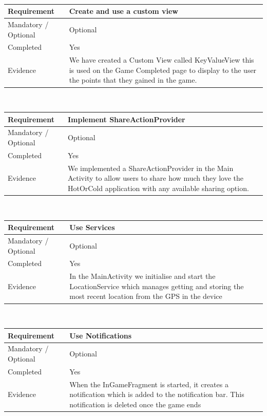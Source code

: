 \documentclass[10pt, a4paper]{article}
\begin{document}
\\
\linebreak
\linebreak
\begin{tabular}{|p{} | p{}|}
\hline 
Requirement & Create and use a custom view \\ 
\hline 
Mandatory / Optional & Optional \\ 
\hline 
Completed & Yes \\ 
\hline 
Evidence & We have created a Custom View called KeyValueView this is used on the Game Completed page to display to the user the points that they gained in the game. \\ 
\hline 
\end{tabular} 
\\
\linebreak
\linebreak
\begin{tabular}{|p{} | p{}|}
\hline 
Requirement & Implement ShareActionProvider \\ 
\hline 
Mandatory / Optional & Optional \\ 
\hline 
Completed & Yes \\ 
\hline 
Evidence &  We implemented a ShareActionProvider in the Main Activity to allow users to share how much they love the HotOrCold application with any available sharing option.\\ 
\hline 
\end{tabular} 
\\
\linebreak
\linebreak
\begin{tabular}{|p{} | p{}|}
\hline 
Requirement & Use Services \\ 
\hline 
Mandatory / Optional & Optional \\ 
\hline 
Completed & Yes \\ 
\hline 
Evidence & In the MainActivity we initialise and start the LocationService which manages getting and storing the most recent location from the GPS in the device \\ 
\hline 
\end{tabular} 
\\
\linebreak
\linebreak
\begin{tabular}{|p{} | p{}|}
\hline 
Requirement & Use Notifications \\ 
\hline 
Mandatory / Optional & Optional \\ 
\hline 
Completed & Yes \\ 
\hline 
Evidence & When the InGameFragment is started, it creates a notification which is added to the notification bar. This notification is deleted once the game ends \\ 
\hline 
\end{tabular} 
\end{document}
